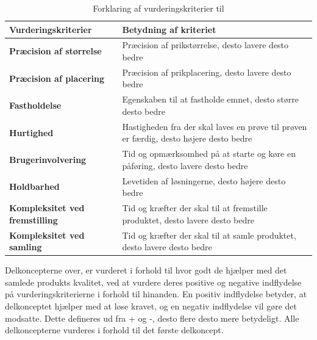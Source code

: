 \begin{table}[H]
    \centering
    \caption{Forklaring af vurderingskriterier til }
    \begin{tabular}{|l|p{9cm}|} \hline
        \rowcolor{gray!20} Vurderingskriterier & Betydning af kriteriet \\ \hline
         \multicolumn{1}{|l|}{\cellcolor{lillaB} \color{white} \textbf{Præcision af størrelse}}  & Præcision af prikstørrelse, desto lavere desto bedre\\  \hline
         \multicolumn{1}{|l|}{\cellcolor{pinkB} \color{white} \textbf{Præcision af placering}}  & Præcision af prikplacering, desto lavere desto bedre \\  \hline
         \multicolumn{1}{|l|}{\cellcolor{gulB} \textbf{Fastholdelse}}  & Egenskaben til at fastholde emnet, desto større desto bedre \\  \hline
         \multicolumn{1}{|l|}{\cellcolor{blueB} \color{white} \textbf{Hurtighed}}  & Hastigheden fra der skal laves en prøve til prøven er færdig, desto højere desto bedre \\\hline
         \multicolumn{1}{|l|}{\cellcolor{redB} \color{white} \textbf{Brugerinvolvering}}  &  Tid og opmærksomhed på at starte og køre en påføring, desto lavere desto bedre \\\hline
         \multicolumn{1}{|l|}{\cellcolor{orangeB} \color{white} \textbf{Holdbarhed}}  &  Levetiden af løsningerne, desto højere desto bedre \\\hline
         \multicolumn{1}{|l|}{\cellcolor{greenB} \color{white} \textbf{Kompleksitet ved fremstilling}}  & Tid og kræfter der skal til at fremstille produktet, desto lavere desto bedre \\\hline
         \multicolumn{1}{|l|}{\cellcolor{greenlysB} \color{white} \textbf{Kompleksitet ved samling}}  &  Tid og kræfter der skal til at samle produktet, desto lavere desto bedre \\\hline
    \end{tabular}
\end{table}

Delkoncepterne over, er vurderet i forhold til hvor godt de hjælper med det samlede produkts kvalitet, ved at vurdere deres positive og negative indflydelse på vurderingskriterierne i forhold til hinanden. En positiv indflydelse betyder, at delkonceptet hjælper med at løse kravet, og en negativ indflydelse vil gøre det modsatte. Dette defineres ud fra + og -, desto flere desto mere betydeligt. Alle delkoncepterne vurderes i forhold til det første delkoncept.

